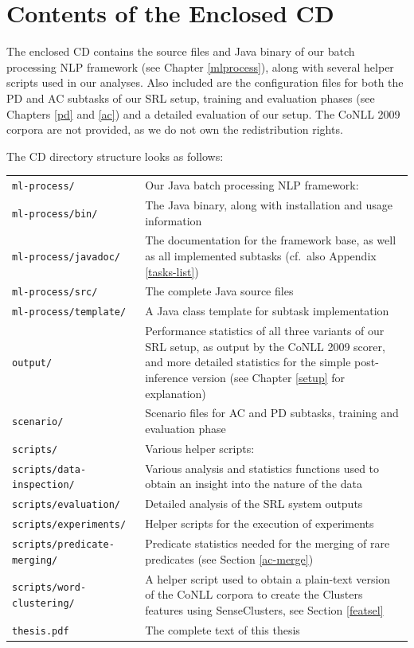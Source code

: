 \documentclass[12pt,notitlepage]{report}
\begin{document}
\chapter{Contents of the Enclosed CD}\label{cd-contents}

\normalsize
The enclosed CD contains the source files and Java binary of our batch processing NLP framework (see Chapter \ref{mlprocess}), along with several helper scripts used in our analyses. Also included are the configuration files for both the PD and AC subtasks of our SRL setup, training and evaluation phases (see Chapters \ref{pd} and \ref{ac}) and a detailed evaluation of our setup. The CoNLL 2009 corpora are not provided, as we do not own the redistribution rights.

The CD directory structure looks as follows:
\footnotesize
\renewcommand{\arraystretch}{1.5}
\begin{longtable}{p{}p{}}
\tt ml-process/ & Our Java batch processing NLP framework: \\
\tt ml-process/bin/ & The Java binary, along with installation and usage information \\
\tt ml-process/javadoc/ & The documentation for the framework base, as well as all implemented subtasks (cf.\ also Appendix \ref{tasks-list}) \\
\tt ml-process/src/ & The complete Java source files \\
\tt ml-process/template/ & A Java class template for subtask implementation \\
\tt output/ & Performance statistics of all three variants of our SRL setup, as output by the CoNLL 2009 scorer, and more detailed statistics for the simple post-inference version (see Chapter \ref{setup} for explanation) \\
\tt scenario/ & Scenario files for AC and PD subtasks, training and evaluation phase \\
\tt scripts/ & Various helper scripts: \\
\tt scripts/data-inspection/ & Various analysis and statistics functions used to obtain an insight into the nature of the data \\
\tt scripts/evaluation/ & Detailed analysis of the SRL system outputs \\
\tt scripts/experiments/ & Helper scripts for the execution of experiments \\
\tt scripts/predicate-merging/ & Predicate statistics needed for the merging of rare predicates (see Section \ref{ac-merge}) \\
\tt scripts/word-clustering/ & A helper script used to obtain a plain-text version of the CoNLL corpora to create the Clusters features using SenseClusters, see Section \ref{featsel} \\
\tt thesis.pdf & The complete text of this thesis \\
\end{longtable}
\end{document}
